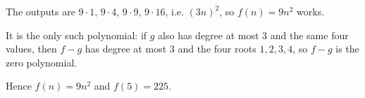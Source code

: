 The outputs are $9\cdot1,\,9\cdot4,\,9\cdot9,\,9\cdot16$, i.e. $(3n)^2$, so $f(n)=9n^2$ works.

It is the only such polynomial: if $g$ also has degree at most $3$ and the same four values, then $f-g$ has degree at most $3$ and the four roots $1,2,3,4$, so $f-g$ is the zero polynomial.

Hence $f(n)=\boxed{9n^2}$ and $f(5)=225$.
